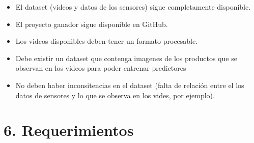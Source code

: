 \documentclass[
11pt, %
codirector, %
]{charter}
\begin{document}
\begin{itemize}
	\item El dataset (videos y datos de los sensores) sigue completamente disponible.
	\item El proyecto ganador sigue disponible en GitHub.
	\item Los videos disponibles deben tener un formato procesable.
	\item Debe existir un dataset que contenga imagenes de los productos que se observan en los videos para poder entrenar predictores
	\item No deben haber inconsitencias en el dataset (falta de relación entre el los datos de sensores y lo que se observa en los vides, por ejemplo).
\end{itemize}


\section{6. Requerimientos}
\label{sec:requerimientos}
\end{document}

